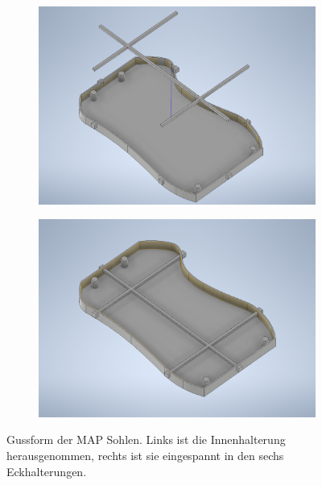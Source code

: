 \begin{figure}[tb]
	\hfill
	\begin{subfigure}[c]{.49\linewidth}
		\centering
		\includegraphics[width=\linewidth]{Bilder/Gussform_Innenteil_verschoben.png}
	\end{subfigure}
	\begin{subfigure}[c]{.49\linewidth}
		\centering
		\includegraphics[width=\linewidth]{Bilder/Gussform.png}		
	\end{subfigure}
	\hfill
	\caption{Gussform der MAP Sohlen. Links ist die Innenhalterung herausgenommen, rechts ist sie eingespannt in den sechs Eckhalterungen.}
	\label{Gussform_Inventor}
\end{figure}

